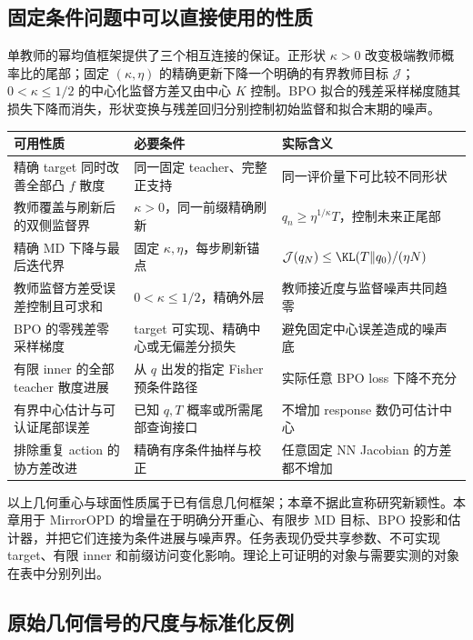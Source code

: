 \subsection{固定条件问题中可以直接使用的性质}

单教师的幂均值框架提供了三个相互连接的保证。正形状 $\kappa>0$ 改变极端教师概率比的尾部；固定 $(\kappa,\eta)$ 的精确更新下降一个明确的有界教师目标 $\mathcal J$；$0<\kappa\le1/2$ 的中心化监督方差又由中心 $K$ 控制。BPO 拟合的残差采样梯度随其损失下降而消失，形状变换与残差回归分别控制初始监督和拟合末期的噪声。

\begin{center}
\small
\begin{tabular}{p{46mm}p{54mm}p{45mm}}
\toprule
可用性质 & 必要条件 & 实际含义\\
\midrule
精确 target 同时改善全部凸 $f$ 散度 & 同一固定 teacher、完整正支持 & 同一评价量下可比较不同形状\\
教师覆盖与刷新后的双侧监督界 & $\kappa>0$，同一前缀精确刷新 & $q_n\ge\eta^{1/\kappa}T$，控制未来正尾部\\
精确 MD 下降与最后迭代界 & 固定 $\kappa,\eta$，每步刷新锚点 & $\mathcal J(q_N)\le\KL(T\Vert q_0)/(\eta N)$\\
教师监督方差受误差控制且可求和 & $0<\kappa\le1/2$，精确外层 & 教师接近度与监督噪声共同趋零\\
BPO 的零残差零采样梯度 & target 可实现、精确中心或无偏差分损失 & 避免固定中心误差造成的噪声底\\
有限 inner 的全部 teacher 散度进展 & 从 $q$ 出发的指定 Fisher 预条件路径 & 实际任意 BPO loss 下降不充分\\
有界中心估计与可认证尾部误差 & 已知 $q,T$ 概率或所需尾部查询接口 & 不增加 response 数仍可估计中心\\
排除重复 action 的协方差改进 & 精确有序条件抽样与校正 & 任意固定 NN Jacobian 的方差都不增加\\
\bottomrule
\end{tabular}
\end{center}

以上几何重心与球面性质属于已有信息几何框架；本章不据此宣称研究新颖性。本章用于 MirrorOPD 的增量在于明确分开重心、有限步 MD 目标、BPO 投影和估计器，并把它们连接为条件进展与噪声界。任务表现仍受共享参数、不可实现 target、有限 inner 和前缀访问变化影响。理论上可证明的对象与需要实测的对象在表中分别列出。

\subsection{原始几何信号的尺度与标准化反例}

